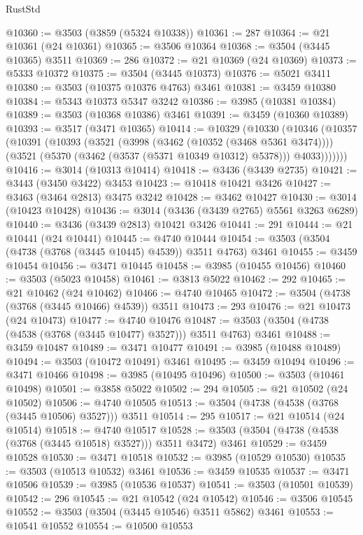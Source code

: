 \begin{lexlean}{RustStd}
\begin{coremodule}
@10360 := @3503 (@3859 (@5324 @10338))
@10361 := 287
@10364 := @21 @10361 (@24 @10361)
@10365 := @3506 @10364
@10368 := @3504 (@3445 @10365) @3511
@10369 := 286
@10372 := @21 @10369 (@24 @10369)
@10373 := @5333 @10372
@10375 := @3504 (@3445 @10373)
@10376 := @5021 @3411
@10380 := @3503 (@10375 @10376 @4763) @3461
@10381 := @3459 @10380
@10384 := @5343 @10373 @5347 @3242
@10386 := @3985 (@10381 @10384)
@10389 := @3503 (@10368 @10386) @3461
@10391 := @3459 (@10360 @10389)
@10393 := @3517 (@3471 @10365)
@10414 := @10329
    (@10330
      (@10346
        (@10357
          (@10391
            (@10393
              (@3521
                (@3998 (@3462 (@10352 (@3468 @5361 @3474))))
                (@3521 (@5370 (@3462 (@3537 (@5371 @10349 @10312) @5378))) @4033)))))))
@10416 := @3014 (@10313 @10414)
@10418 := @3436 (@3439 @2735)
@10421 := @3443 (@3450 @3422) @3453
@10423 := @10418 @10421 @3426
@10427 := @3463 (@3464 @2813) @3475 @3242
@10428 := @3462 @10427
@10430 := @3014 (@10423 @10428)
@10436 := @3014 (@3436 (@3439 @2765) @5561 @3263 @6289)
@10440 := @3436 (@3439 @2813) @10421 @3426
@10441 := 291
@10444 := @21 @10441 (@24 @10441)
@10445 := @4740 @10444
@10454 := @3503 (@3504 (@4738 (@3768 (@3445 @10445) @4539)) @3511 @4763) @3461
@10455 := @3459 @10454
@10456 := @3471 @10445
@10458 := @3985 (@10455 @10456)
@10460 := @3503 (@5023 @10458)
@10461 := @3813 @5022
@10462 := 292
@10465 := @21 @10462 (@24 @10462)
@10466 := @4740 @10465
@10472 := @3504 (@4738 (@3768 (@3445 @10466) @4539)) @3511
@10473 := 293
@10476 := @21 @10473 (@24 @10473)
@10477 := @4740 @10476
@10487 := @3503 (@3504 (@4738 (@4538 (@3768 (@3445 @10477) @3527))) @3511 @4763) @3461
@10488 := @3459 @10487
@10489 := @3471 @10477
@10491 := @3985 (@10488 @10489)
@10494 := @3503 (@10472 @10491) @3461
@10495 := @3459 @10494
@10496 := @3471 @10466
@10498 := @3985 (@10495 @10496)
@10500 := @3503 (@10461 @10498)
@10501 := @3858 @5022
@10502 := 294
@10505 := @21 @10502 (@24 @10502)
@10506 := @4740 @10505
@10513 := @3504 (@4738 (@4538 (@3768 (@3445 @10506) @3527))) @3511
@10514 := 295
@10517 := @21 @10514 (@24 @10514)
@10518 := @4740 @10517
@10528 := @3503 (@3504 (@4738 (@4538 (@3768 (@3445 @10518) @3527))) @3511 @3472) @3461
@10529 := @3459 @10528
@10530 := @3471 @10518
@10532 := @3985 (@10529 @10530)
@10535 := @3503 (@10513 @10532) @3461
@10536 := @3459 @10535
@10537 := @3471 @10506
@10539 := @3985 (@10536 @10537)
@10541 := @3503 (@10501 @10539)
@10542 := 296
@10545 := @21 @10542 (@24 @10542)
@10546 := @3506 @10545
@10552 := @3503 (@3504 (@3445 @10546) @3511 @5862) @3461
@10553 := @10541 @10552
@10554 := @10500 @10553

\end{coremodule}
\end{lexlean}
